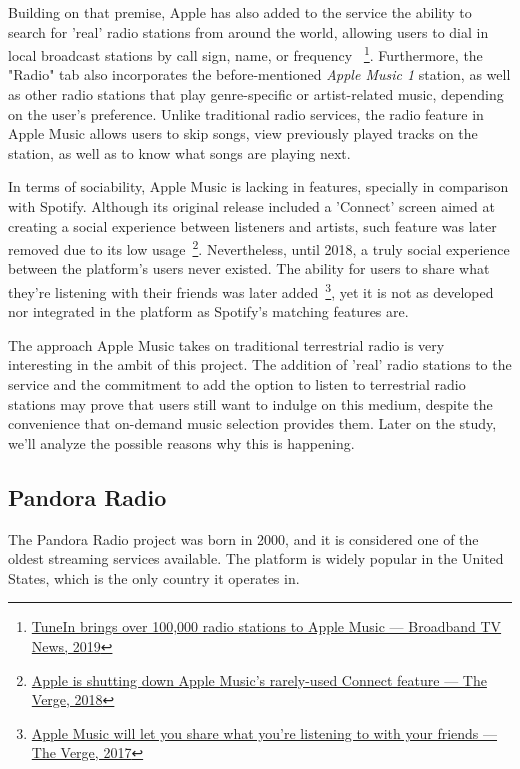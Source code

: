 Building on that premise, Apple has also added to the service the ability to search for 'real' radio stations from around the world, allowing users to dial in local broadcast stations by call sign, name, or frequency ~\footnote{\href{https://www.broadbandtvnews.com/2019/09/25/tunein-brings-over-100000-radio-stations-to-apple-music/}{TuneIn brings over 100,000 radio stations to Apple Music — Broadband TV News, 2019}}. Furthermore, the "Radio" tab also incorporates the before-mentioned \textit{Apple Music 1} station, as well as other radio stations that play genre-specific or artist-related music, depending on the user's preference. Unlike traditional radio services, the radio feature in Apple Music allows users to skip songs, view previously played tracks on the station, as well as to know what songs are playing next.

In terms of sociability, Apple Music is lacking in features, specially in comparison with Spotify. Although its original release included a 'Connect' screen aimed at creating a social experience between listeners and artists, such feature was later removed due to its low usage~\footnote{\href{https://www.theverge.com/2018/12/13/18139837/apple-music-connect-social-network-feature-discontinued}{Apple is shutting down Apple Music’s rarely-used Connect feature — The Verge, 2018}}. Nevertheless, until 2018, a truly social experience between the platform's users never existed. The ability for users to share what they're listening with their friends was later added~\footnote{\href{https://www.theverge.com/2017/6/5/15727014/apple-music-app-update-social-features-wwdc-2017}{Apple Music will let you share what you’re listening to with your friends — The Verge, 2017}}, yet it is not as developed nor integrated in the platform as Spotify's matching features are.

The approach Apple Music takes on traditional terrestrial radio is very interesting in the ambit of this project. The addition of 'real' radio stations to the service and the commitment to add the option to listen to terrestrial radio stations may prove that users still want to indulge on this medium, despite the convenience that on-demand music selection provides them. Later on the study, we'll analyze the possible reasons why this is happening.

\subsection{Pandora Radio}

The Pandora Radio project was born in 2000, and it is considered one of the oldest streaming services available. The platform is widely popular in the United States, which is the only country it operates in.

